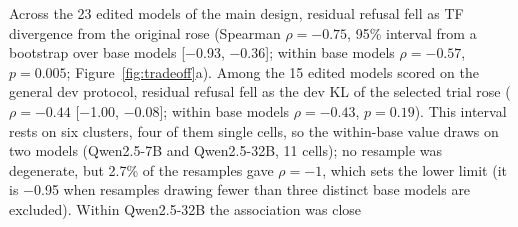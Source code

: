 Across the 23 edited models of the main design, residual refusal fell as TF divergence from the original rose
(Spearman $\rho=-0.75$, 95\% interval from a bootstrap over base models [$-$0.93, $-$0.36]; within base models
$\rho=-0.57$, $p=0.005$; Figure~\ref{fig:tradeoff}a). Among the 15 edited models scored on the general dev
protocol, residual refusal fell as the dev KL of the selected trial rose ($\rho=-0.44$ [$-$1.00, $-$0.08]; within base
models $\rho=-0.43$, $p=0.19$). This interval rests on six clusters, four of them single cells, so the within-base
value draws on two models (Qwen2.5-7B and Qwen2.5-32B, 11 cells); no resample was degenerate, but 2.7\% of the
resamples gave $\rho=-1$, which sets the lower limit (it is $-$0.95 when resamples drawing fewer than three distinct
base models are excluded). Within Qwen2.5-32B the association was close
